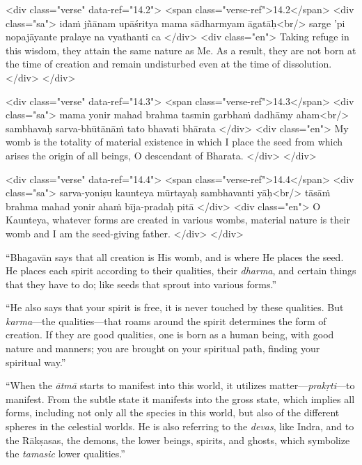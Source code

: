 \begin{html}
<div class="verse" data-ref="14.2">
  <span class="verse-ref">14.2</span>
  <div class="sa">
    idaṁ jñānam upāśritya mama sādharmyam āgatāḥ<br/>
    sarge ’pi nopajāyante pralaye na vyathanti ca
  </div>
  <div class="en">
    Taking refuge in this wisdom, they attain the same nature as Me. As a result, they are not born at the time of creation and remain undisturbed even at the time of dissolution.
  </div>
</div>
\end{html}



\begin{html}
<div class="verse" data-ref="14.3">
  <span class="verse-ref">14.3</span>
  <div class="sa">
    mama yonir mahad brahma tasmin garbhaṁ dadhāmy aham<br/>
    sambhavaḥ sarva-bhūtānāṁ tato bhavati bhārata
  </div>
  <div class="en">
    My womb is the totality of material existence in which I place the seed from which arises the origin of all beings, O descendant of Bharata.
  </div>
</div>
\end{html}



\begin{html}
<div class="verse" data-ref="14.4">
  <span class="verse-ref">14.4</span>
  <div class="sa">
    sarva-yoniṣu kaunteya mūrtayaḥ sambhavanti yāḥ<br/>
    tāsāṁ brahma mahad yonir ahaṁ bīja-pradaḥ pitā
  </div>
  <div class="en">
    O Kaunteya, whatever forms are created in various wombs, material nature is their womb and I am the seed-giving father.
  </div>
</div>
\end{html}


\enquote{Bhagavān says that all creation is His womb, and is where He places the seed. He places each spirit according to their qualities, their \textit{dharma}, and certain things that they have to do; like seeds that sprout into various forms.}

\enquote{He also says that your spirit is free, it is never touched by these qualities. But \textit{karma}---the qualities---that roams around the spirit determines the form of creation. If they are good qualities, one is born as a human being, with good nature and manners; you are brought on your spiritual path, finding your spiritual way.}

\enquote{When the \textit{ātmā} starts to manifest into this world, it utilizes matter---\textit{prakṛti}---to manifest. From the subtle state it manifests into the gross state, which implies all forms, including not only all the species in this world, but also of the different spheres in the celestial worlds. He is also referring to the \textit{devas}, like Indra, and to the Rākṣasas, the demons, the lower beings, spirits, and ghosts, which symbolize the \textit{tamasic} lower qualities.}

